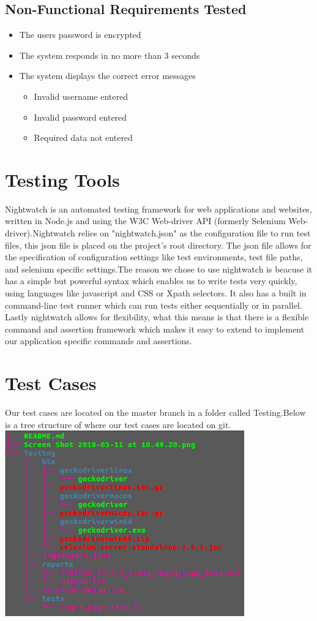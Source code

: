 \documentclass[12pt]{article}
\begin{document}
	\subsection{Non-Functional Requirements Tested}
	\begin{itemize}
		\item The users password is encrypted
		\item The system responds in no more than 3 seconds
		\item The system displays the correct error messages
		\begin{itemize}
			\item Invalid username entered
			\item Invalid password entered
			\item Required data not entered
		\end{itemize}
	\end{itemize}
	
	\section{Testing Tools}
	Nightwatch is an automated testing framework for web applications and websites, written in Node.js and using the W3C Web-driver API (formerly Selenium Web-driver).Nightwatch relies on "nightwatch.json" as the configuration file to run test files, this json file is placed on the project's root directory. The json file allows for the specification of configuration settings like test environments, test file paths, and selenium specific settings.The reason we chose to use nightwatch is beacuse it has a simple but powerful syntax which enables us to write tests very quickly, using languages like javascript and CSS or Xpath selectors. It also has a built in command-line test runner which can run tests either sequentially or in parallel. Lastly nightwatch allows for flexibility, what this means is that there is a flexible command and assertion framework which makes it easy to extend to implement our application specific commands and assertions.
	
	
	\section{Test Cases}
	Our test cases are located on the master branch in a folder called Testing.Below is a tree structure of where our test cases are located on git.
	\includegraphics[width=0.8\linewidth, height=8cm]{tree.png}
	
\end{document}

